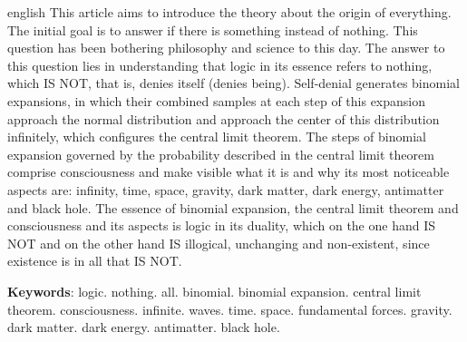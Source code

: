 \renewcommand{\resumoname}{Abstract}
\begin{resumoumacoluna}
 \begin{otherlanguage*}{english}
\vspace{-2mm}
	This article aims to introduce the theory about the origin of everything. The initial goal is to answer if there is something instead of nothing. This question has been bothering philosophy and science to this day. The answer to this question lies in understanding that logic in its essence refers to nothing, which IS NOT, that is, denies itself (denies being). Self-denial generates binomial expansions, in which their combined samples at each step of this expansion approach the normal distribution and approach the center of this distribution infinitely, which configures the central limit theorem. The steps of binomial expansion governed by the probability described in the central limit theorem comprise consciousness and make visible what it is and why its most noticeable aspects are: infinity, time, space, gravity, dark matter, dark energy, antimatter and black hole. The essence of binomial expansion, the central limit theorem and consciousness and its aspects is logic in its duality, which on the one hand IS NOT and on the other hand IS illogical, unchanging and non-existent, since existence is in all that IS NOT.
	\vspace{\onelineskip} 
	\noindent
	
	\textbf{Keywords}: logic. nothing. all. binomial. binomial expansion. central limit theorem. consciousness. infinite. waves. time. space. fundamental forces. gravity. dark matter. dark energy. antimatter. black hole.
 \end{otherlanguage*}  
\end{resumoumacoluna}

